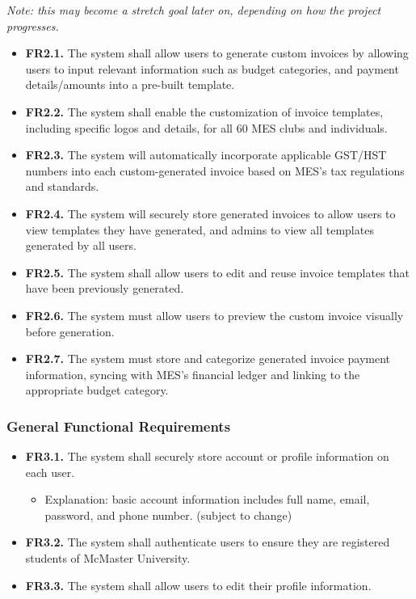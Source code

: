 \documentclass[12pt]{article}
\begin{document}
\label{FRTwo}

\textit{Note: this may become a stretch goal later on, depending on how the project progresses.}
\begin{itemize}
    \item \textbf{FR2.1.} The system shall allow users to generate custom invoices by allowing users to input relevant information such as budget categories, and payment details/amounts into a pre-built template.
    \item \textbf{FR2.2.} The system shall enable the customization of invoice templates, including specific logos and details, for all 60 MES clubs and individuals.
    \item \textbf{FR2.3.} The system will automatically incorporate applicable GST/HST numbers into each custom-generated invoice based on MES's tax regulations and standards.
    \item \textbf{FR2.4.} The system will securely store generated invoices to allow users to view templates they have generated, and admins to view all templates generated by all users.
    \item \textbf{FR2.5.} The system shall allow users to edit and reuse invoice templates that have been previously generated.
    \item \textbf{FR2.6.} The system must allow users to preview the custom invoice visually before generation.
    \item \textbf{FR2.7.} The system must store and categorize generated invoice payment information, syncing with MES's financial ledger and linking to the appropriate budget category.
\end{itemize}

\subsubsection{General Functional Requirements}

\label{FRThree}

\begin{itemize}
    \item \textbf{FR3.1.} The system shall securely store account or profile information on each user.
    \begin{itemize}
        \item Explanation: basic account information includes full name, email, password, and phone number. (subject to change)
    \end{itemize}
    \item \textbf{FR3.2.} The system shall authenticate users to ensure they are registered students of McMaster University.
    \item \textbf{FR3.3.} The system shall allow users to edit their profile information.
\end{itemize}
    
\end{document}

